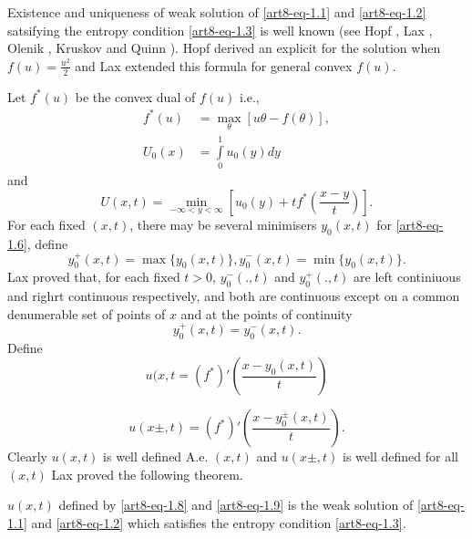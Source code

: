 Existence and uniqueness of weak solution of \eqref{art8-eq-1.1} and \eqref{art8-eq-1.2} satsifying the entropy condition \eqref{art8-eq-1.3} is well known (see Hopf \cite{art8-key2}, Lax \cite{art8-key9}, Olenik \cite{art8-key14}, Kruskov \cite{art8-key7} and Quinn \cite{art8-key13}). Hopf \cite{art8-key2} derived an explicit for the solution when $f(u) = \frac{u^{2}}{2}$ and Lax \cite{art8-key9} extended this formula for general convex $f(u)$.

Let $f^{*}(u)$ be the convex dual of $f(u)$ i.e.,
\begin{align}
f^{*}(u) &= \max\limits_{\theta}[u\theta - f(\theta)],\label{art8-eq-1.4}\\
U_{0}(x)&= \int\limits_{0}^{1} u_{0}(y)dy \label{art8-eq-1.5}
\end{align}
and
\begin{equation}\label{art8-eq-1.6}
U(x, t) = \min\limits_{-\infty < y < \infty}\left[u_{0}(y) + tf^{*}\left(\dfrac{x-y}{t}\right) \right].
\end{equation}
For each fixed $(x, t)$, there may be several minimisers $y_{0}(x,t)$ for \eqref{art8-eq-1.6}, define
\begin{equation}\label{art8-eq-1.7}
y_{0}^{+}(x,t)=\max\{y_{0}(x,t)\},y_{0}^{-}(x,t)= \min\{y_{0}(x,t)\}. 
\end{equation}
Lax \cite{art8-key9} proved that, for each fixed $t > 0$, $y_{0}^{-}(.,t)$ and $y_{0}^{+}(., t)$ are left continiuous and righrt continuous respectively, and both are continuous except on a common denumerable set of points of $x$ and at the points of continuity
$$
y_{0}^{+}(x,t) =y_{0}^{-}(x,t).
$$
Define
\begin{equation}\label{art8-eq-1.8}
u(x,t  =(f^{*})'\left(\dfrac{x-y_{0}(x,t)}{t}\right)
\end{equation}

\begin{equation}\label{art8-eq-1.9}
u(x \pm, t) = (f^{*})' \left(\dfrac{x-y_{0}^{\pm}(x,t)}{t}\right).
\end{equation}
Clearly $u(x,t)$ is well defined A.e. $(x,t)$ and $u(x \pm, t)$ is well defined for all $(x, t)$ Lax \cite{art8-key9} proved the following theorem.

\begin{theorem}\label{art8-thm-1}
$u(x,t)$ defined by \eqref{art8-eq-1.8} and \eqref{art8-eq-1.9} is the weak solution of \eqref{art8-eq-1.1} and
\eqref{art8-eq-1.2} which satisfies the entropy condition \eqref{art8-eq-1.3}. 
\end{theorem}

